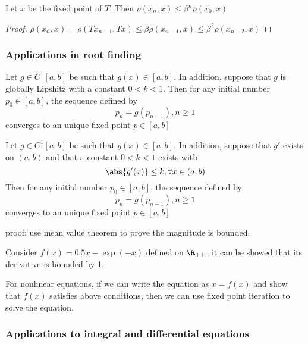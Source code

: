\begin{refsection}
\begin{corollary} Let $x$ be the fixed point of $T$. Then
	$\rho(x_n,x) \leq \beta^n \rho(x_0,x)$ 
\end{corollary}
\begin{proof}
	$\rho(x_n,x) = \rho(Tx_{n-1},Tx) \leq \beta \rho(x_{n-1},x) \leq \beta^2 \rho(x_{n-2},x) $	
\end{proof}



\subsubsection{Applications in root finding}

\begin{theorem}
	Let $g\in C^{1}[a,b]$ be such that $g(x)\in [a,b]$. In addition, suppose that $g$ is globally Lipshitz with a constant $0<k<1$. 
	Then for any initial number $p_0 \in [a,b]$, the sequence defined by 
	$$p_n = g(p_{n-1}),n \geq 1$$
	converges to an unique fixed point $p\in [a,b]$
\end{theorem}

\begin{corollary}
	Let $g\in C^{1}[a,b]$ be such that $g(x)\in [a,b]$. In addition, suppose that $g'$ exists on $(a,b)$ and that a constant $0<k<1$ exists with 
	$$\abs{g'(x)} \leq k, \forall x \in (a,b)$$
	Then for any initial number $p_0 \in [a,b]$, the sequence defined by 
	$$p_n = g(p_{n-1}),n \geq 1$$
	converges to an unique fixed point $p\in [a,b]$
\end{corollary}
proof: use mean value theorem to prove the magnitude is bounded.



\begin{example}
	Consider $f(x) = 0.5 x - \exp(-x)$ defined on $\R_{++}$, it can be showed that its derivative is bounded by 1.
\end{example}

\begin{remark}
	For nonlinear equations, if we can write the equation as $x = f(x)$ and show that $f(x)$ satisfies above conditions, then we can use fixed point iteration to solve the equation.
\end{remark}


\subsubsection{Applications to integral and differential equations}


\end{refsection}
